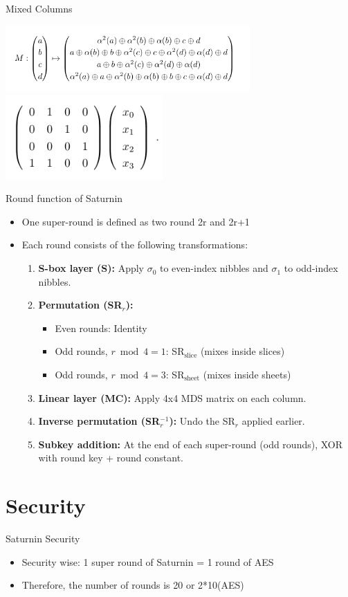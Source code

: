 \begin{frame}{Mixed Columns}
            \begin{center}
\includegraphics[width=0.7\textwidth,height=0.6\textheight,keepaspectratio]{Images/Figures/mc1.png}
\includegraphics[width=0.45\textwidth,height=0.5\textheight,keepaspectratio]{Images/Figures/mc2.png}
\end{center}
\end{frame}

\begin{frame}{Round function of Saturnin}

\begin{itemize}
    \item One super-round is defined as two round 2r and 2r+1
    \item Each round consists of the following transformations:
    \begin{enumerate}
        \item \textbf{S-box layer (S):} Apply $\sigma_0$ to even-index nibbles and $\sigma_1$ to odd-index nibbles.
        \item \textbf{Permutation (SR$_r$):} 
        \begin{itemize}
            \item Even rounds: Identity
            \item Odd rounds, $r \bmod 4 = 1$: SR$_{\text{slice}}$ (mixes inside slices)
            \item Odd rounds, $r \bmod 4 = 3$: SR$_{\text{sheet}}$ (mixes inside sheets)
        \end{itemize}
        \item \textbf{Linear layer (MC):} Apply 4x4 MDS matrix on each column.
        \item \textbf{Inverse permutation (SR$_r^{-1}$):} Undo the SR$_r$ applied earlier.
        \item \textbf{Subkey addition:} At the end of each super-round (odd rounds), XOR with round key + round constant.
    \end{enumerate}
\end{itemize}

\end{frame}

\section{Security}
\begin{frame}{Saturnin Security}
    \begin{itemize}
        \item Security wise: 1 super round of Saturnin = 1 round of AES
        \item Therefore, the number of rounds is 20 or 2*10(AES)
    \end{itemize}
\end{frame}

